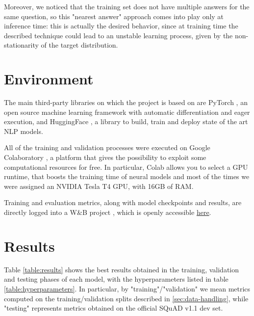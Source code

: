 \documentclass[a4paper,10pt]{report}
\begin{document}
Moreover, we noticed that the training set does not have multiple answers for the same question, so this "nearest answer" approach comes into play only at inference time: this is actually the desired behavior, since at training time the described technique could lead to an unstable learning process, given by the non-stationarity of the target distribution.

\section{Environment}
The main third-party libraries on which the project is based on are PyTorch \cite{pytorch}, an open source machine learning framework with automatic differentiation and eager execution, and HuggingFace \cite{huggingface}, a library to build, train and deploy state of the art NLP models.

All of the training and validation processes were executed on Google Colaboratory \cite{colab}, a platform that gives the possibility to exploit some computational resources for free. In particular, Colab allows you to select a GPU runtime, that boosts the training time of neural models and most of the times we were assigned an NVIDIA Tesla T4 GPU, with 16GB of RAM.

Training and evaluation metrics, along with model checkpoints and results, are directly logged into a W\&B project \cite{wandb}, which is openly accessible \href{https://wandb.ai/wadaboa/squad-qa}{here}.

\section{Results}\label{sec:results}
Table \ref{table:results} shows the best results obtained in the training, validation and testing phases of each model, with the hyperparameters listed in table \ref{table:hyperparameters}. In particular, by "training"/"validation" we mean metrics computed on the training/validation splits described in \ref{sec:data-handling}, while "testing" represents metrics obtained on the official SQuAD v1.1 dev set.
\end{document}
